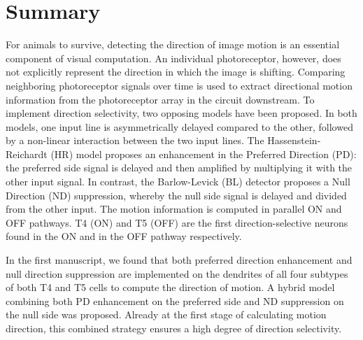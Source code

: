 
\begingroup
\let\clearpage\relax
\let\cleardoublepage\relax
\let\cleardoublepage\relax

\chapter*{Summary}

For animals to survive, detecting the direction of image motion is an essential component of visual computation. An individual photoreceptor, however, does not explicitly represent the direction in which the image is shifting. Comparing neighboring photoreceptor signals over time is used to extract directional motion information from the photoreceptor array in the circuit downstream. To implement direction selectivity, two opposing models have been proposed. In both models, one input line is asymmetrically delayed compared to the other, followed by a non-linear interaction between the two input lines. The Hassenstein-Reichardt (HR) model proposes an enhancement in the Preferred Direction (PD): the preferred side signal is delayed and then amplified by multiplying it with the other input signal. In contrast, the Barlow-Levick (BL) detector proposes a Null Direction (ND) suppression, whereby the null side signal is delayed and divided from the other input. The motion information is computed in parallel ON and OFF pathways. T4 (ON) and T5 (OFF) are the first direction-selective neurons found in the ON and in the OFF pathway respectively.

In the first manuscript, we found that both preferred direction enhancement and null direction suppression are implemented on the dendrites of all four subtypes of both T4 and T5 cells to compute the direction of motion. A hybrid model combining both PD enhancement on the preferred side and ND suppression on the null side was proposed. Already at the first stage of calculating motion direction, this combined strategy ensures a high degree of direction selectivity. 

